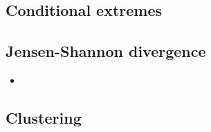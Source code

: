 \documentclass{article}
\numberwithin{equation}{section}
\begin{document}




\subsection{Conditional extremes}


\subsection{Jensen-Shannon divergence}


\begin{itemize}
  \item 
\end{itemize}

\subsection{Clustering}

\end{document}
